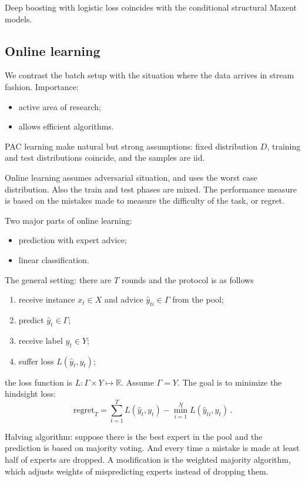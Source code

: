 \documentclass[a4paper]{article}
\newcommand{\Real}{\mathbb{R}}
\begin{document}
\noindent Deep boosting with logistic loss coincides with the conditional structural
Maxent models.


\subsection{Online learning} %
\label{sub:online_learning}

We contrast the batch setup with the situation where the data arrives in stream
fashion. Importance: \begin{itemize}
    \item active area of research;
    \item allows efficient algorithms.
\end{itemize}
PAC learning make natural but strong assumptions: fixed distribution $D$, training
and test distributions coincide, and the samples are iid.

Online learning assumes adversarial situation, and uses the worst case distribution.
Also the train and test phases are mixed. The performance measure is based on the
mistakes made to measure the difficulty of the task, or regret.

Two major parts of online learning: \begin{itemize}
    \item prediction with expert advice;
    \item linear classification.
\end{itemize}

The general setting: there are $T$ rounds and the protocol is as follows
\begin{enumerate}
    \item receive instance $x_t\in X$ and advice $\hat{y}_{ti}\in \Gamma$ from the pool;
    \item predict $\hat{y}_t \in \Gamma$;
    \item receive label $y_t \in Y$;
    \item suffer loss $L(\hat{y}_t, y_t)$;
\end{enumerate}
the loss function is $L:\Gamma \times Y \mapsto \Real$. Assume $\Gamma=Y$.
The goal is to minimize the hindsight loss:
\[\text{regret}_T = \sum_{t=1}^T L(\hat{y}_t, y_t) - \min_{i=1}^N L(\hat{y}_{ti}, y_t) \,. \]

Halving algorithm: suppose there is the best expert in the pool and the prediction
is based on majority voting. And every time a mistake is made at least half of experts
are dropped. A modification is the weighted majority algorithm, which adjusts weights
of mispredicting experts instead of dropping them.
\end{document}
